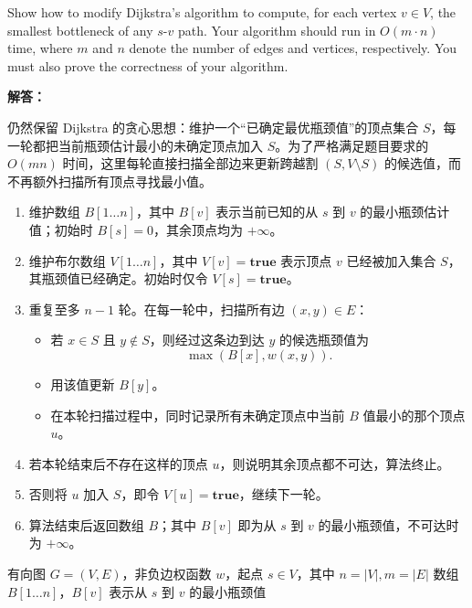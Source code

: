 ﻿\documentclass[12pt,a4paper]{article}
\begin{document}
Show how to modify Dijkstra's algorithm to compute, for each vertex $v \in V$, the smallest bottleneck of any $s$-$v$ path. Your algorithm should run in $O(m \cdot n)$ time, where $m$ and $n$ denote the number of edges and vertices, respectively. You must also prove the correctness of your algorithm.

\begin{answerbox}
\textbf{解答：}

仍然保留 Dijkstra 的贪心思想：维护一个“已确定最优瓶颈值”的顶点集合 $S$，每一轮都把当前瓶颈估计最小的未确定顶点加入 $S$。为了严格满足题目要求的 $O(mn)$ 时间，这里每轮直接扫描全部边来更新跨越割 $(S, V \setminus S)$ 的候选值，而不再额外扫描所有顶点寻找最小值。

\begin{enumerate}
    \item 维护数组 $B[1 \dots n]$，其中 $B[v]$ 表示当前已知的从 $s$ 到 $v$ 的最小瓶颈估计值；初始时 $B[s]=0$，其余顶点均为 $+\infty$。
    \item 维护布尔数组 $V[1 \dots n]$，其中 $V[v]=\textbf{true}$ 表示顶点 $v$ 已经被加入集合 $S$，其瓶颈值已经确定。初始时仅令 $V[s]=\textbf{true}$。
    \item 重复至多 $n-1$ 轮。在每一轮中，扫描所有边 $(x,y)\in E$：
    \begin{itemize}
        \item 若 $x \in S$ 且 $y \notin S$，则经过这条边到达 $y$ 的候选瓶颈值为
        \[
        \max(B[x], w(x,y)).
        \]
        \item 用该值更新 $B[y]$。
        \item 在本轮扫描过程中，同时记录所有未确定顶点中当前 $B$ 值最小的那个顶点 $u$。
    \end{itemize}
    \item 若本轮结束后不存在这样的顶点 $u$，则说明其余顶点都不可达，算法终止。
    \item 否则将 $u$ 加入 $S$，即令 $V[u]=\textbf{true}$，继续下一轮。
    \item 算法结束后返回数组 $B$；其中 $B[v]$ 即为从 $s$ 到 $v$ 的最小瓶颈值，不可达时为 $+\infty$。
\end{enumerate}

\begin{algorithm}[H]
\caption{最小瓶颈路径算法}
\label{alg:minimax-dijkstra}
\begin{algorithmic}[1]
\REQUIRE 有向图 $G=(V,E)$，非负边权函数 $w$，起点 $s \in V$，其中 $n=|V|, m=|E|$
\ENSURE 数组 $B[1 \dots n]$，$B[v]$ 表示从 $s$ 到 $v$ 的最小瓶颈值


\end{algorithmic}
\end{algorithm}
\end{answerbox}
\end{document}
